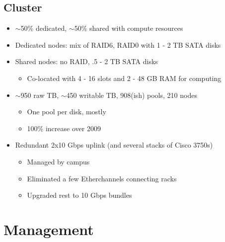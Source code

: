 \documentclass{beamer}
\newcommand{\ca}{\ensuremath{\sim}}
\begin{document}
\subsection{Cluster}
\begin{frame}
\begin{itemize}
	\item \ca{}50\% dedicated, \ca{}50\% shared with compute resources
	\item Dedicated nodes: mix of RAID6, RAID0 with 1 - 2 TB SATA disks
	\item Shared nodes: no RAID, .5 - 2 TB SATA disks
	\begin{itemize}
		\item Co-located with 4 - 16 slots and 2 - 48 GB RAM for computing
	\end{itemize}
	\item \ca{}950 raw TB, \ca{}450 writable TB, 908(ish) pools, 210 nodes
	\begin{itemize}
		\item One pool per disk, mostly
		\item 100\% increase over 2009
	\end{itemize}
	\item Redundant 2x10 Gbps uplink (and several stacks of Cisco 3750s)
	\begin{itemize}
		\item Managed by campus
		\item Eliminated a few Etherchannels connecting racks
		\item Upgraded rest to 10 Gbps bundles
	\end{itemize}
\end{itemize}
\end{frame}

\section{Management}
\end{document}

